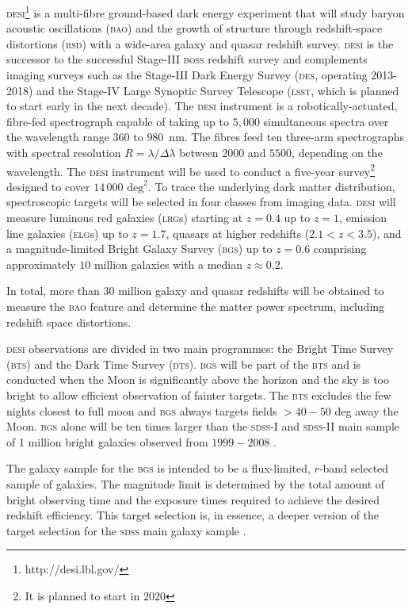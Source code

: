 \documentclass[fleqn,usenatbib]{mnras}
\newcommand{\BAO}{\textsc{bao}\xspace}
\newcommand{\BGS}{\textsc{bgs}\xspace}
\newcommand{\BOSS}{\textsc{boss}\xspace}
\newcommand{\BTS}{\textsc{bts}\xspace}
\newcommand{\DESI}{\textsc{desi}\xspace}
\newcommand{\DES}{\textsc{des}\xspace}
\newcommand{\DTS}{\textsc{dts}\xspace}
\newcommand{\ELGs}{\textsc{elg}s\xspace}
\newcommand{\LRGs}{\textsc{lrg}s\xspace}
\newcommand{\LSST}{\textsc{lsst}\xspace}
\newcommand{\MGS}{\textsc{mgs}\xspace}
\newcommand{\RSD}{\textsc{rsd}\xspace}
\newcommand{\SDSS}{\textsc{sdss}\xspace}
\begin{document}
\DESI \citep{Aghamousa:2016zmz}\footnote{http://desi.lbl.gov/} is a multi-fibre ground-based dark energy experiment that will study baryon acoustic oscillations (\BAO) and the growth of structure through redshift-space distortions (\RSD) with a wide-area galaxy and quasar redshift survey. \DESI is the successor to the successful Stage-III \BOSS redshift
survey \citep{doi:10.1093/mnras/sts314} and complements imaging surveys such as the Stage-III Dark Energy Survey \citep{Crocce:2017iwq} (\DES, operating 2013-2018) and the Stage-IV Large Synoptic Survey Telescope (\LSST, which is planned to start early in the next decade). The \DESI instrument is a robotically-actuated, fibre-fed spectrograph capable of taking up
to $5,000$ simultaneous spectra over the wavelength range $360$ to $980$~nm. The fibres feed ten three-arm spectrographs with spectral resolution $R = \lambda/\Delta\lambda$ between $2000$ and $5500$, depending on the
wavelength. The \DESI instrument will be used to conduct a five-year survey\footnote{It is planned to start in $2020$} designed to cover $14\,000$ $\textrm{deg}^2$. To trace the underlying dark matter distribution, spectroscopic targets will be selected in four classes from imaging data. \DESI will measure luminous red galaxies (\LRGs) starting at $z = 0.4$ up to $z = 1$, emission line galaxies (\ELGs) up to $z = 1.7$, quasars at higher redshifts ($2.1 < z < 3.5$), and a magnitude-limited Bright Galaxy Survey (\BGS) up to $z = 0.6$ comprising approximately $10$ million galaxies with a median $z \approx 0.2$. 

In total, more than 30 million galaxy and quasar redshifts will be obtained to measure the \BAO feature and determine the matter power spectrum, including redshift space distortions.



\DESI observations are divided in two main programmes: the Bright Time Survey (\BTS) and the Dark Time Survey (\DTS). \BGS will be part of the \BTS and is conducted when the Moon is significantly above the horizon
and the sky is too bright to allow efficient observation of fainter targets.  The \BTS 
excludes the few nights closest to full moon
and \BGS always targets fields
$> 40 - 50$ deg away the Moon. 
\BGS alone will be ten times larger than the \SDSS-I and \SDSS-II main sample of 1 million bright galaxies observed from $1999-2008$ \citep{Abazajian:2003jy}.

The galaxy sample for the \BGS is intended to be a flux-limited, $r$-band selected sample of galaxies. The magnitude limit is determined by the total amount of  bright observing time and the exposure times required to achieve the desired redshift efficiency. This target selection is, in essence, a deeper version of the  target selection for the \SDSS main galaxy sample \cite[\MGS,][]{2002AJ....124.1810S}.
\end{document}
